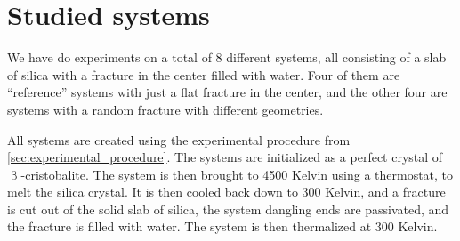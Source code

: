 \chapter{Studied systems}
%
%
We have do experiments on a total of 8 different systems, all consisting of a slab of silica with a fracture in the center filled with water. Four of them are ``reference'' systems with just a flat fracture in the center, and the other four are systems with a random fracture with different geometries.

All systems are created using the experimental procedure from \cref{sec:experimental_procedure}. The systems are initialized as a perfect crystal of $\upbeta$-cristobalite. The system is then brought to 4500 Kelvin using a thermostat, to melt the silica crystal. It is then cooled back down to 300 Kelvin, and a fracture is cut out of the solid slab of silica, the system dangling ends are passivated, and the fracture is filled with water. The system is then thermalized at 300 Kelvin.

